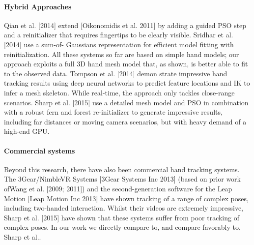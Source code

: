 \begin{DRAFT}
\paragraph{Hybrid Approaches} 
Qian et al. [2014] extend [Oikonomidis et al. 2011] by adding a guided PSO step and a reinitializer that requires fingertips to be clearly visible. Sridhar et al. [2014] use a sum-of- Gaussians representation for efficient model fitting with reinitialization. All these systems so far are based on simple hand models; our approach exploits a full 3D hand mesh model that, as shown, is better able to fit to the observed data. Tompson et al. [2014] demon strate impressive hand tracking results using deep neural networks to predict feature locations and IK to infer a mesh skeleton. While real-time, the approach only tackles close-range scenarios. Sharp et al. [2015] use a detailed mesh model and PSO in combination with a robust fern and forest re-initializer to generate impressive results, including far distances or moving camera scenarios, but with heavy demand of a high-end GPU.

\paragraph{Commercial systems} 
Beyond this research, there have also been commercial hand tracking systems. The 3Gear/NimbleVR Systems [3Gear Systems Inc 2013] (based on prior work ofWang et al. [2009; 2011]) and the second-generation software for the Leap Motion [Leap Motion Inc 2013] have shown tracking of a range of complex poses, including two-handed interaction. Whilst their videos are extremely impressive, Sharp et al. [2015] have shown that these systems suffer from poor tracking of complex poses. In our work we directly compare to, and compare favorably to, Sharp et al..
\end{DRAFT}

\endinput


\TODO{\cite{bogo2015detailed}}

\TODO{A higher precision can be obtained by increasing the number of primitives, which defeats the purpose of model simplicity. Convolution surfaces representation gives higher precision for the same number of building blocks. \textcolor{mygray}{Add experimental or theoretical support for convolution surfaces.}}

